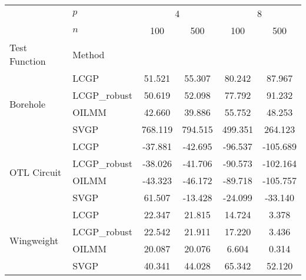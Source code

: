 \begin{tabular}{llcccc}
\hline
 &  $p$  & \multicolumn{2}{c}{4} & \multicolumn{2}{c}{8} \\
 & $n$ & 100 & 500 & 100 & 500 \\
Test Function &  Method  &  &  &  &  \\
\hline
\hline\multirow[c]{4}{*}{Borehole} & LCGP & 51.521 & 55.307 & 80.242 & 87.967 \\
 & LCGP\_robust & 50.619 & 52.098 & 77.792 & 91.232 \\
 & OILMM & 42.660 & 39.886 & 55.752 & 48.253 \\
 & SVGP & 768.119 & 794.515 & 499.351 & 264.123 \\
\hline\multirow[c]{4}{*}{OTL Circuit} & LCGP & -37.881 & -42.695 & -96.537 & -105.689 \\
 & LCGP\_robust & -38.026 & -41.706 & -90.573 & -102.164 \\
 & OILMM & -43.323 & -46.172 & -89.718 & -105.757 \\
 & SVGP & 61.507 & -13.428 & -24.099 & -33.140 \\
\hline\multirow[c]{4}{*}{Wingweight} & LCGP & 22.347 & 21.815 & 14.724 & 3.378 \\
 & LCGP\_robust & 22.542 & 21.911 & 17.220 & 3.436 \\
 & OILMM & 20.087 & 20.076 & 6.604 & 0.314 \\
 & SVGP & 40.341 & 44.028 & 65.342 & 52.120 \\
\hline
\end{tabular}
